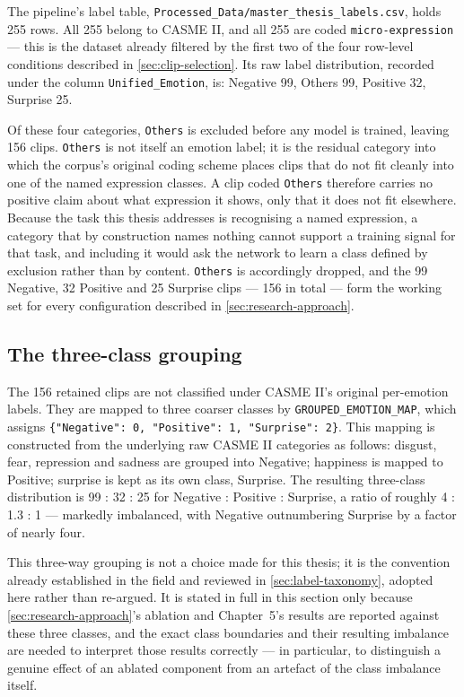 The pipeline's label table, \texttt{Processed\_Data/master\_thesis\_labels.csv}, holds 255 rows. All 255 belong to CASME II, and all 255 are coded \texttt{micro-expression} --- this is the dataset already filtered by the first two of the four row-level conditions described in \autoref{sec:clip-selection}. Its raw label distribution, recorded under the column \texttt{Unified\_Emotion}, is: Negative 99, Others 99, Positive 32, Surprise 25.

Of these four categories, \texttt{Others} is excluded before any model is trained, leaving 156 clips. \texttt{Others} is not itself an emotion label; it is the residual category into which the corpus's original coding scheme places clips that do not fit cleanly into one of the named expression classes. A clip coded \texttt{Others} therefore carries no positive claim about what expression it shows, only that it does not fit elsewhere. Because the task this thesis addresses is recognising a named expression, a category that by construction names nothing cannot support a training signal for that task, and including it would ask the network to learn a class defined by exclusion rather than by content. \texttt{Others} is accordingly dropped, and the 99 Negative, 32 Positive and 25 Surprise clips --- 156 in total --- form the working set for every configuration described in \autoref{sec:research-approach}.

\subsection{The three-class grouping}
\label{sec:three-class-grouping}

The 156 retained clips are not classified under CASME II's original per-emotion labels. They are mapped to three coarser classes by \texttt{GROUPED\_EMOTION\_MAP}, which assigns \verb|{"Negative": 0, "Positive": 1, "Surprise": 2}|. This mapping is constructed from the underlying raw CASME II categories as follows: disgust, fear, repression and sadness are grouped into Negative; happiness is mapped to Positive; surprise is kept as its own class, Surprise. The resulting three-class distribution is 99 : 32 : 25 for Negative : Positive : Surprise, a ratio of roughly 4 : 1.3 : 1 --- markedly imbalanced, with Negative outnumbering Surprise by a factor of nearly four.

This three-way grouping is not a choice made for this thesis; it is the convention already established in the field and reviewed in \autoref{sec:label-taxonomy}, adopted here rather than re-argued. It is stated in full in this section only because \autoref{sec:research-approach}'s ablation and Chapter~5's results are reported against these three classes, and the exact class boundaries and their resulting imbalance are needed to interpret those results correctly --- in particular, to distinguish a genuine effect of an ablated component from an artefact of the class imbalance itself.

